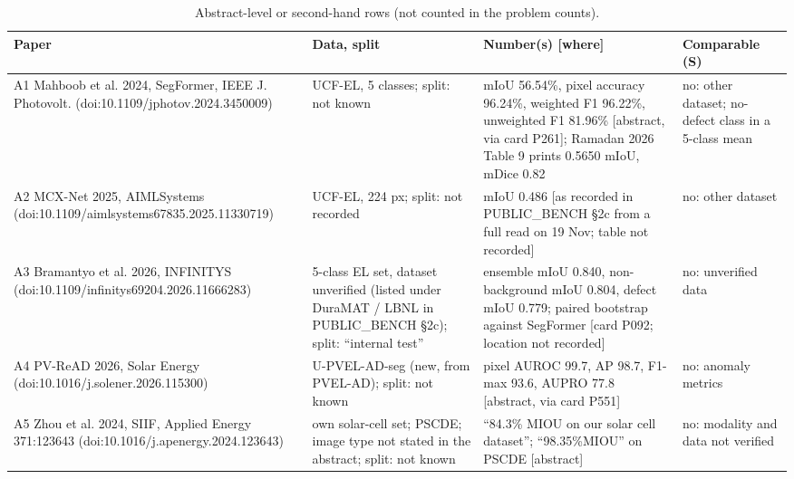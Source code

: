 \begin{table}[ht]\centering\scriptsize\setlength{\tabcolsep}{3pt}
\caption{Abstract-level or second-hand rows (not counted in the problem counts).}\label{tab:rw_abs}
\begin{tabular}{>{\raggedright\hspace{0pt}}p{3.6cm} >{\raggedright\hspace{0pt}}p{3.2cm} >{\raggedright\hspace{0pt}}p{5.6cm} >{\raggedright\arraybackslash\hspace{0pt}}p{2.6cm}}
\toprule
Paper & Data, split & Number(s) [where] & Comparable (S) \\
\midrule
A1 Mahboob et al. 2024, SegFormer, IEEE J. Photovolt. (doi:\allowbreak{}10.\allowbreak{}1109/\allowbreak{}jphotov.\allowbreak{}2024.\allowbreak{}3450009) & UCF-EL, 5 classes; split: not known & mIoU 56.54\%, pixel accuracy 96.24\%, weighted F1 96.22\%, unweighted F1 81.96\% [abstract, via card P261]; Ramadan 2026 Table 9 prints 0.5650 mIoU, mDice 0.82 & no: other dataset; no-defect class in a 5-class mean \\
A2 MCX-Net 2025, AIMLSystems (doi:\allowbreak{}10.\allowbreak{}1109/\allowbreak{}aimlsystems67835.\allowbreak{}2025.\allowbreak{}11330719) & UCF-EL, 224 px; split: not recorded & mIoU 0.486 [as recorded in PUBLIC\_BENCH \S{}2c from a full read on 19 Nov; table not recorded] & no: other dataset \\
A3 Bramantyo et al. 2026, INFINITYS (doi:\allowbreak{}10.\allowbreak{}1109/\allowbreak{}infinitys69204.\allowbreak{}2026.\allowbreak{}11666283) & 5-class EL set, dataset unverified (listed under DuraMAT / LBNL in PUBLIC\_BENCH \S{}2c); split: ``internal test'' & ensemble mIoU 0.840, non-background mIoU 0.804, defect mIoU 0.779; paired bootstrap against SegFormer [card P092; location not recorded] & no: unverified data \\
A4 PV-ReAD 2026, Solar Energy (doi:\allowbreak{}10.\allowbreak{}1016/\allowbreak{}j.\allowbreak{}solener.\allowbreak{}2026.\allowbreak{}115300) & U-PVEL-AD-seg (new, from PVEL-AD); split: not known & pixel AUROC 99.7, AP 98.7, F1-max 93.6, AUPRO 77.8 [abstract, via card P551] & no: anomaly metrics \\
A5 Zhou et al. 2024, SIIF, Applied Energy 371:123643 (doi:\allowbreak{}10.\allowbreak{}1016/\allowbreak{}j.\allowbreak{}apenergy.\allowbreak{}2024.\allowbreak{}123643) & own solar-cell set; PSCDE; image type not stated in the abstract; split: not known & ``84.3\% MIOU on our solar cell dataset''; ``98.35\%MIOU'' on PSCDE [abstract] & no: modality and data not verified \\

\end{tabular}
\end{table}
